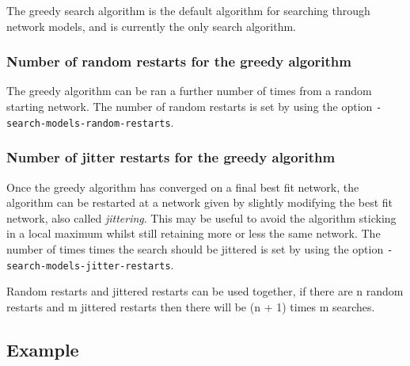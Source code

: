 \documentclass[a4paper,12pt]{article}
\newcommand{\code}[1]{{\footnotesize{{\tt #1}}}}
\begin{document}
The greedy search algorithm is the default algorithm for searching through network models, and is currently the only search algorithm. 
\subsubsection{Number of random restarts for the greedy algorithm}
\label{search-models-greedy-restart}

The greedy algorithm can be ran a further number of times from a random starting network. The number of random restarts is set by using the option \code{-search-models-random-restarts}. 


\subsubsection{Number of jitter restarts for the greedy algorithm}
\label{search-models-greedy-jitter}

Once the greedy algorithm has converged on a final best fit network, the algorithm can be restarted at a network given by slightly modifying the best fit network, also called {\it jittering}. This may be useful to avoid the algorithm sticking in a local maximum whilst still retaining more or less the same network. The number of times times the search should be jittered is set by using the option \code{-search-models-jitter-restarts}. 

Random restarts and jittered restarts can be used together, if there are n random restarts and m jittered restarts then there will be (n + 1) times m searches. 




\subsection{Example}
\label{search-models-example}
\end{document}
